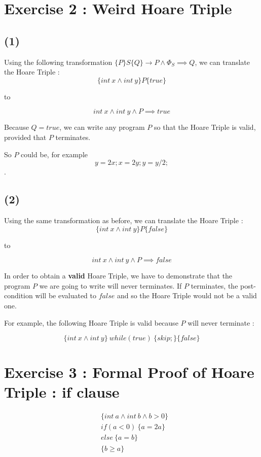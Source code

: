 \documentclass[a4paper,11pt]{report}
\begin{document}
\section*{Exercise 2 : Weird Hoare Triple}

\subsection*{(1)}

Using the following transformation $\{P\}S\{Q\} \rightarrow P \wedge \Phi_S
\implies Q$, we can translate the Hoare Triple :
$$
\{int\ x \wedge int\ y\}P\{true\}
$$

to

$$
int\ x \wedge int\ y \wedge P \implies true
$$

Because $Q = true$, we can write any program $P$ so that the Hoare Triple is
valid, provided that $P$ terminates.

So $P$ could be, for example $$y = 2x; x = 2y; y = y / 2;$$.

\subsection*{(2)}

Using the same transformation as before, we can translate the Hoare Triple :
$$
\{int\ x \wedge int\ y\} P \{false\}
$$

to

$$
int\ x \wedge int\ y \wedge P \implies false
$$

In order to obtain a \textbf{valid} Hoare Triple, we have to demonstrate that
the program $P$ we are going to write will never terminates. If $P$ terminates,
the post-condition will be evaluated to $false$ and so the Hoare Triple would
not be a valid one.

For example, the following Hoare Triple is valid because $P$ will never
terminate :

$$
\{int\ x \wedge int\ y\}\ while(true)\ \{skip;\} \{false\}
$$

\section*{Exercise 3 : Formal Proof of Hoare Triple : if clause}

\begin{align*}
  & \{int\ a \wedge int\ b \wedge b > 0\} \\
  & if(a < 0)\ \{a = 2a\} \\
  & else\ \{a = b\} \\
  & \{b \geq a\}
\end{align*}
\end{document}
